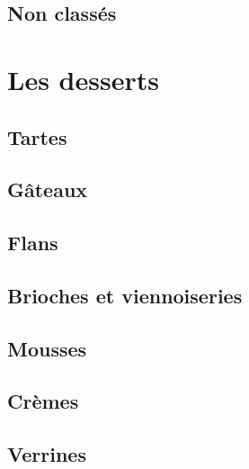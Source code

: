 \documentclass[A4paper,twoside, 12pt]{book}
\begin{document}
	\chapter{Non classés}

	

\part{Les desserts}
	\chapter{Tartes}


	\chapter{G\^ateaux}







		
	\chapter{Flans}


	\chapter{Brioches et viennoiseries}




	\chapter{Mousses}
	\chapter{Cr\`emes}


	\chapter{Verrines}
	
\end{document}
